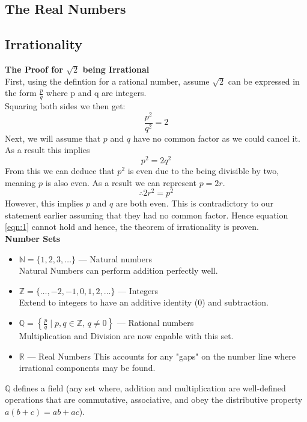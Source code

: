 \documentclass[12pt,twoside]{article}
\numberwithin{equation}{section} %
\numberwithin{figure}{section}
\numberwithin{table}{section}
\begin{document}


\tableofcontents
\newpage

\begin{adjustwidth}{0in}{0in} 
\section{The Real Numbers}
\subsection{Irrationality}
\textbf{The Proof for $\sqrt{2}$ being Irrational}\\
First, using the defintion for a rational number, assume $\sqrt{2}$ can be expressed in the form $\frac{p}{q}$ 
where p and q are integers.\\
Squaring both sides we then get:
\begin{equation}
    \frac{p^2}{q^2} = 2
    \label{eqn:1}
\end{equation}
Next, we will assume that $p$ and $q$ have no common factor as we could cancel it. As a result this implies 
\begin{equation}
   p^2 = 2q^2 
   \label{eqn:2}
\end{equation}
From this we can deduce that $p^2$ is even due to the being divisible by two, meaning $p$ is also even. As a result
we can represent $p = 2r$. 
\begin{equation}
    \therefore 2r^2 = p^2
    \label{eqn:3}
\end{equation}
However, this implies $p$ and $q$ are both even. This is contradictory to our statement earlier assuming that they had no common factor.
Hence equation \eqref{eqn:1} cannot hold and hence, the theorem of irrationality is proven.\\
\textbf{Number Sets}
\begin{itemize}
    \item $\mathbb{N} = \{1, 2, 3, \ldots\}$ — Natural numbers\\
    Natural Numbers can perform addition perfectly well.
    \item $\mathbb{Z} = \{\ldots, -2, -1, 0, 1, 2, \ldots\}$ — Integers\\
    Extend to integers to have an additive identity (0) and subtraction.
    \item $\mathbb{Q} = \left\{ \frac{p}{q} \mid p, q \in \mathbb{Z},\, q \neq 0 \right\}$ — Rational numbers\\
    Multiplication and Division are now capable with this set.
    \item $\mathbb{R}$ — Real Numbers
    This accounts for any "gaps" on the number line where irrational components may be found.
\end{itemize}
$\mathbb{Q}$ defines a field (any set where,  addition and multiplication are well-defined operations
that are commutative, associative, and obey the distributive property $a(b + c) = ab + ac$).


\end{adjustwidth}  
\end{document}
